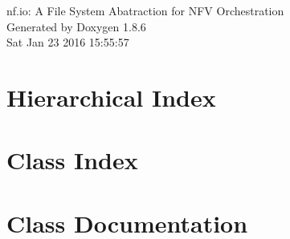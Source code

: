 \documentclass[twoside]{book}
\newcommand{\clearemptydoublepage}{%
  \newpage{\pagestyle{empty}\cleardoublepage}%
}
\begin{document}
\hypersetup{pageanchor=false}
\begin{titlepage}
\vspace*{7cm}
\begin{center}%
{\Large nf.\-io\-: A File System Abatraction for N\-F\-V Orchestration }\\
\vspace*{1cm}
{\large Generated by Doxygen 1.8.6}\\
\vspace*{0.5cm}
{\small Sat Jan 23 2016 15:55:57}\\
\end{center}
\end{titlepage}
\clearemptydoublepage
\tableofcontents
\clearemptydoublepage
{}
\hypersetup{pageanchor=true}

\chapter{Hierarchical Index}

\chapter{Class Index}

\chapter{Class Documentation}


















\newpage
{}
{}
\printindex
\end{document}
